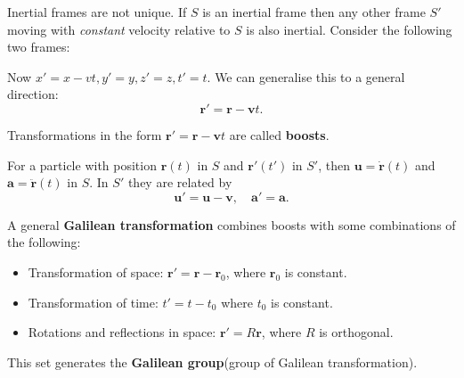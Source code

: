 \begin{note}
    Inertial frames are not unique. If $S$ is an inertial frame then any other frame $S'$ moving with \textit{constant} velocity relative to $S$ is also inertial. Consider the following two frames:
    \begin{center}
    \end{center}
    Now $ x'=x-vt, y'=y, z'=z, t'=t $. We can generalise this to a general direction: 
    \[
        \mathbf{r}'=\mathbf{r}-\mathbf{v}t.
    \]
\end{note}
\begin{definition}[Boosts]
    Transformations in the form $\mathbf{r}'=\mathbf{r}-\mathbf{v}t$ are called \textbf{boosts}.
\end{definition}

For a particle with position $ \mathbf{r}(t) $ in $S$ and $ \mathbf{r}'(t') $ in $S'$, then $\mathbf{u}=\dot{\mathbf{r}}(t)$ and $ \mathbf{a}=\ddot{\mathbf{r}}(t) $ in $S$. In $S'$ they are related by 
\[
    \mathbf{u}' = \mathbf{u}-\mathbf{v},\quad \mathbf{a}'=\mathbf{a}.
\] 

\begin{definition}
    A general \textbf{Galilean transformation} combines boosts with some combinations of the following: 
    \begin{itemize}
        \item Transformation of space: $ \mathbf{r}'=\mathbf{r}-\mathbf{r}_0 $, where $\mathbf{r}_0$ is constant.
        \item Transformation of time: $ t'=t-t_0 $ where $t_0$ is constant.
        \item Rotations and reflections in space: $ \mathbf{r}'=R\mathbf{r} $, where $R$ is orthogonal.
    \end{itemize}
    This set generates the \textbf{Galilean group}(group of Galilean transformation).
\end{definition}

